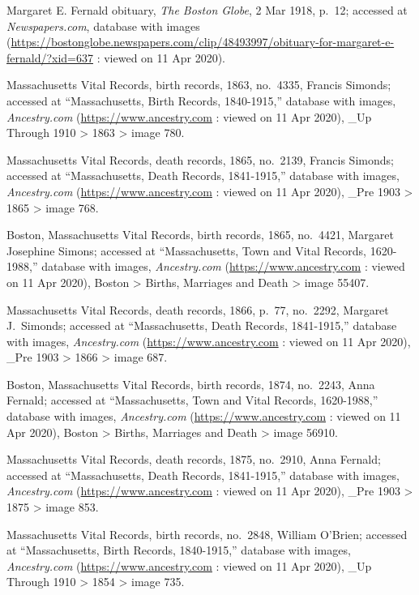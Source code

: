 \begin{thebibliography}{999}
	Margaret E. Fernald obituary, \textit{The Boston Globe}, 2 Mar 1918, p.\ 12; accessed at \textit{Newspapers.com}, database with images (\url{https://bostonglobe.newspapers.com/clip/48493997/obituary-for-margaret-e-fernald/?xid=637} : viewed on 11 Apr 2020).
	
	Massachusetts Vital Records, birth records, 1863, no.\ 4335, Francis Simonds; accessed at ``Massachusetts, Birth Records, 1840-1915,'' database with images, \textit{Ancestry.com} (\url{https://www.ancestry.com} : viewed on 11 Apr 2020), \_Up Through 1910 > 1863 > image 780.
	
	Massachusetts Vital Records, death records, 1865, no.\ 2139, Francis Simonds; accessed at ``Massachusetts, Death Records, 1841-1915,'' database with images, \textit{Ancestry.com} (\url{https://www.ancestry.com} : viewed on 11 Apr 2020), \_Pre 1903 > 1865 > image 768.
	
	Boston, Massachusetts Vital Records, birth records, 1865, no.\ 4421, Margaret Josephine Simons; accessed at ``Massachusetts, Town and Vital Records, 1620-1988,'' database with images, \textit{Ancestry.com} (\url{https://www.ancestry.com} : viewed on 11 Apr 2020), Boston > Births, Marriages and Death > image 55407.
	
	Massachusetts Vital Records, death records, 1866, p.\ 77, no.\ 2292, Margaret J.\ Simonds; accessed at ``Massachusetts, Death Records, 1841-1915,'' database with images, \textit{Ancestry.com} (\url{https://www.ancestry.com} : viewed on 11 Apr 2020), \_Pre 1903 > 1866 > image 687.
	
	Boston, Massachusetts Vital Records, birth records, 1874, no.\ 2243, Anna Fernald; accessed at ``Massachusetts, Town and Vital Records, 1620-1988,'' database with images, \textit{Ancestry.com} (\url{https://www.ancestry.com} : viewed on 11 Apr 2020), Boston > Births, Marriages and Death > image 56910.
	
	Massachusetts Vital Records, death records, 1875, no.\ 2910, Anna Fernald; accessed at ``Massachusetts, Death Records, 1841-1915,'' database with images, \textit{Ancestry.com} (\url{https://www.ancestry.com} : viewed on 11 Apr 2020), \_Pre 1903 > 1875 > image 853.
	
	Massachusetts Vital Records, birth records, no.\ 2848, William O'Brien; accessed at ``Massachusetts, Birth Records, 1840-1915,'' database with images, \textit{Ancestry.com} (\url{https://www.ancestry.com} : viewed on 11 Apr 2020), \_Up Through 1910 > 1854 > image 735.
	

\end{thebibliography}
